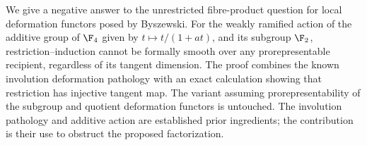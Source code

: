 
We give a negative answer to the unrestricted fibre-product question for
local deformation functors posed by Byszewski. For the weakly ramified action
of the additive group of $\F_4$ given by $t\mapsto t/(1+at)$, and its subgroup
$\F_2$, restriction--induction cannot be formally smooth over any
prorepresentable recipient, regardless of its tangent dimension. The proof
combines the known involution deformation pathology with an exact calculation
showing that restriction has injective tangent map. The variant assuming
prorepresentability of the subgroup and quotient deformation functors is
untouched. The involution pathology and additive action are established prior
ingredients; the contribution is their use to obstruct the proposed
factorization.
